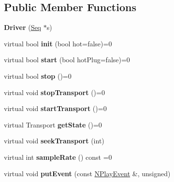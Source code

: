 \subsection*{Public Member Functions}
\begin{DoxyCompactItemize}
\item 
\mbox{\label{class_ms_1_1_driver_a0fac70a2949e1d9ac263991ad7e1838a}} 
{\bfseries Driver} (\hyperlink{class_ms_1_1_seq}{Seq} $\ast$s)
\item 
\mbox{\label{class_ms_1_1_driver_a66d0135d9d073db75bae39dc860f47f6}} 
virtual bool {\bfseries init} (bool hot=false)=0
\item 
\mbox{\label{class_ms_1_1_driver_a8c07a53282a68727fdf5c407c0e187bc}} 
virtual bool {\bfseries start} (bool hot\+Plug=false)=0
\item 
\mbox{\label{class_ms_1_1_driver_a0ce53ff7a63d0ed799f6662bd7e97f1f}} 
virtual bool {\bfseries stop} ()=0
\item 
\mbox{\label{class_ms_1_1_driver_a205bb9c90c179f57b012fb522853f1ae}} 
virtual void {\bfseries stop\+Transport} ()=0
\item 
\mbox{\label{class_ms_1_1_driver_ad753204c3ce1e711052ec464e54c0e96}} 
virtual void {\bfseries start\+Transport} ()=0
\item 
\mbox{\label{class_ms_1_1_driver_ace631b870020f3fa49f6714a395dbb0a}} 
virtual Transport {\bfseries get\+State} ()=0
\item 
\mbox{\label{class_ms_1_1_driver_ada4c143f5ad3ca0c687040dcfed507b3}} 
virtual void {\bfseries seek\+Transport} (int)
\item 
\mbox{\label{class_ms_1_1_driver_ac0e704b412376538419e8fe71272ba57}} 
virtual int {\bfseries sample\+Rate} () const =0
\item 
\mbox{\label{class_ms_1_1_driver_ac5a50399fcc567f27ed1be5335e9054a}} 
virtual void {\bfseries put\+Event} (const \hyperlink{class_ms_1_1_n_play_event}{N\+Play\+Event} \&, unsigned)

\end{DoxyCompactItemize}
